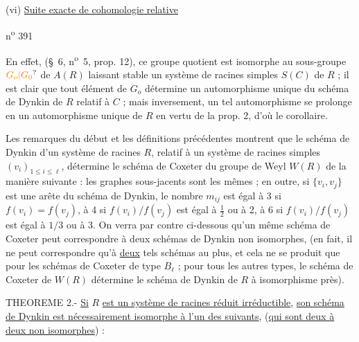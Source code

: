 (vi) \uline{Suite exacte de cohomologie relative}

\hfill n\textsuperscript{o} 391

En effet, (\S~6, n\textsuperscript{o}~5, prop. 12), ce groupe quotient est isomorphe au sous-groupe $\unsure{G_o|G_0}$ de $A(R)$ laissant stable un système de racines simples $S(C)$ de $R$ ; il est clair que tout élément de $G_o$ détermine un automorphisme unique du schéma de Dynkin de $R$ relatif à $C$ ; mais inversement, un tel automorphisme se prolonge en un automorphisme unique de $R$ en vertu de la prop. 2, d'où le corollaire.

Les remarques du début et les définitions précédentes montrent que le schéma de Dynkin d'un système de racines $R$, relatif à un système de racines simples $(v_i)_{1\leq i\leq\ell}$, détermine le schéma de Coxeter du groupe de Weyl $W(R)$ de la manière suivante : les graphes sous-jacents sont les mêmes ; en outre, si $\{v_i,v_j\}$ est une arête du schéma de Dynkin, le nombre $m_{ij}$ est égal à 3 si $f(v_i)=f(v_j)$, à 4 si $f(v_i)/f(v_j)$ est égal à $\frac{1}{2}$ ou à 2, à 6 si $f(v_i)/f(v_j)$ est égal à $1/3$ ou à 3. On verra par contre ci-dessous qu'un même schéma de Coxeter peut correspondre à deux schémas de Dynkin non isomorphes, (en fait, il ne peut correspondre qu'à \uline{deux} tels schémas au plus, et cela ne se produit que pour les schémas de Coxeter de type $B_\ell$ ; pour tous les autres types, le schéma de Coxeter de $W(R)$ détermine le schéma de Dynkin de $R$ à isomorphisme près).

THEOREME 2.- \uline{Si} $R$ \uline{est un système de racines réduit irréductible}, \uline{son schéma de Dynkin est nécessairement isomorphe à l'un des suivants}, (\uline{qui sont deux à deux non isomorphes}) :



